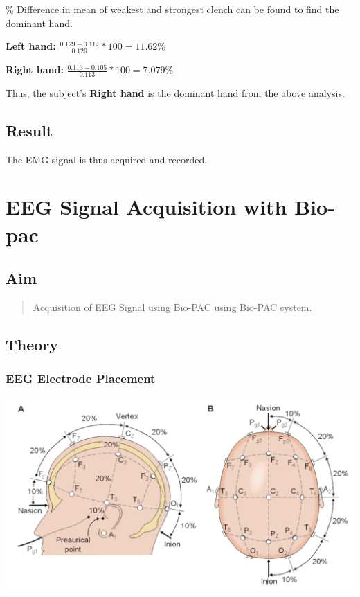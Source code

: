 \documentclass[
  11pt,
  letterpaper,
  DIV=11,
  numbers=noendperiod]{scrreprt}
\begin{document}
\% Difference in mean of weakest and strongest clench can be found to
find the dominant hand.

\textbf{Left hand:} \(\frac{0.129 - 0.114}{0.129} * 100 = 11.62\%\)

\textbf{Right hand:} \(\frac{0.113 - 0.105}{0.113} * 100 = 7.079\%\)

Thus, the subject's \textbf{Right hand} is the dominant hand from the
above analysis.

\section{Result}\label{result-2}

The EMG signal is thus acquired and recorded.


\chapter{EEG Signal Acquisition with
Bio-pac}\label{eeg-signal-acquisition-with-bio-pac}

\section{Aim}\label{aim-3}

\begin{quote}
Acquisition of EEG Signal using Bio-PAC using Bio-PAC system.
\end{quote}

\section{Theory}\label{theory-3}

\subsection{EEG Electrode Placement}\label{eeg-electrode-placement}

\includegraphics[width=5.63542in,height=\textheight]{images/clipboard-1080795871.png}
\end{document}
